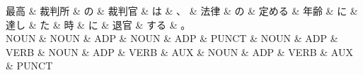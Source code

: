 \documentclass[tikz,border=5pt]{standalone}
\begin{document}
\normalsize
\begin{dependency}[edge unit distance=12.0pt]
    \begin{deptext}[column sep=1em]
        最高 \& 裁判所 \& の \& 裁判官 \& は \& 、 \& 法律 \& の \& 定める \& 年齢 \& に \& 達し \& た \& 時 \& に \& 退官 \& する \& 。\\
        NOUN \& NOUN \& ADP \& NOUN \& ADP \& PUNCT \& NOUN \& ADP \& VERB \& NOUN \& ADP \& VERB \& AUX \& NOUN \& ADP \& VERB \& AUX \& PUNCT\\
    \end{deptext}
\end{dependency}
\end{document}
